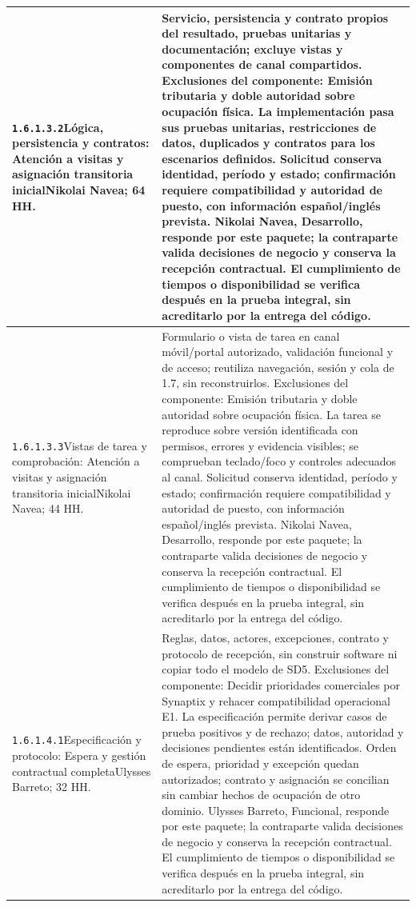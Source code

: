 \begin{longtable}{L{52mm}L{91mm}}
\texttt{1.\allowbreak{}6.\allowbreak{}1.\allowbreak{}3.\allowbreak{}2}\newline Lógica, persistencia y contratos: Atención a visitas y asignación transitoria inicial\newline Nikolai Navea; 64 HH. & Servicio, persistencia y contrato propios del resultado, pruebas unitarias y documentación; excluye vistas y componentes de canal compartidos. Exclusiones del componente: Emisión tributaria y doble autoridad sobre ocupación física. La implementación pasa sus pruebas unitarias, restricciones de datos, duplicados y contratos para los escenarios definidos. Solicitud conserva identidad, período y estado; confirmación requiere compatibilidad y autoridad de puesto, con información español/inglés prevista. Nikolai Navea, Desarrollo, responde por este paquete; la contraparte valida decisiones de negocio y conserva la recepción contractual. El cumplimiento de tiempos o disponibilidad se verifica después en la prueba integral, sin acreditarlo por la entrega del código.\\\hline
\texttt{1.\allowbreak{}6.\allowbreak{}1.\allowbreak{}3.\allowbreak{}3}\newline Vistas de tarea y comprobación: Atención a visitas y asignación transitoria inicial\newline Nikolai Navea; 44 HH. & Formulario o vista de tarea en canal móvil/portal autorizado, validación funcional y de acceso; reutiliza navegación, sesión y cola de 1.7, sin reconstruirlos. Exclusiones del componente: Emisión tributaria y doble autoridad sobre ocupación física. La tarea se reproduce sobre versión identificada con permisos, errores y evidencia visibles; se comprueban teclado/foco y controles adecuados al canal. Solicitud conserva identidad, período y estado; confirmación requiere compatibilidad y autoridad de puesto, con información español/inglés prevista. Nikolai Navea, Desarrollo, responde por este paquete; la contraparte valida decisiones de negocio y conserva la recepción contractual. El cumplimiento de tiempos o disponibilidad se verifica después en la prueba integral, sin acreditarlo por la entrega del código.\\\hline
\texttt{1.\allowbreak{}6.\allowbreak{}1.\allowbreak{}4.\allowbreak{}1}\newline Especificación y protocolo: Espera y gestión contractual completa\newline Ulysses Barreto; 32 HH. & Reglas, datos, actores, excepciones, contrato y protocolo de recepción, sin construir software ni copiar todo el modelo de SD5. Exclusiones del componente: Decidir prioridades comerciales por Synaptix y rehacer compatibilidad operacional E1. La especificación permite derivar casos de prueba positivos y de rechazo; datos, autoridad y decisiones pendientes están identificados. Orden de espera, prioridad y excepción quedan autorizados; contrato y asignación se concilian sin cambiar hechos de ocupación de otro dominio. Ulysses Barreto, Funcional, responde por este paquete; la contraparte valida decisiones de negocio y conserva la recepción contractual. El cumplimiento de tiempos o disponibilidad se verifica después en la prueba integral, sin acreditarlo por la entrega del código.\\\hline

\end{longtable}
